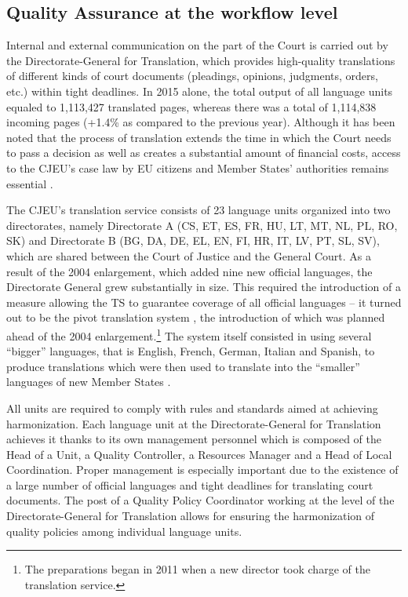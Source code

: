 \documentclass[output=paper]{langsci/langscibook}
\begin{document}
\subsection{Quality Assurance at the workflow level}\label{sec:kozbial:4.2}

Internal and external communication on the part of the Court is carried out by the Directorate-General for Translation, which provides high-quality translations of different kinds of court documents (pleadings, opinions, judgments, orders, etc.) within tight deadlines. In 2015 alone, the total output of all language units equaled to 1,113,427 translated pages, whereas there was a total of 1,114,838 incoming pages (+1.4\% as compared to the previous year). Although it has been noted that the process of translation extends the time in which the Court needs to pass a decision as well as creates a substantial amount of financial costs, access to the CJEU’s case law by EU citizens and Member States’ authorities remains essential \citep[23]{Roper2011}. 

The CJEU’s translation service consists of 23 language units organized into two directorates, namely Directorate A (CS, ET, ES, FR, HU, LT, MT, NL, PL, RO, SK) and Directorate B (BG, DA, DE, EL, EN, FI, HR, IT, LV, PT, SL, SV), which are shared between the Court of Justice and the General Court. As a result of the 2004 enlargement, which added nine new official languages, the Directorate General grew substantially in size. This required the introduction of a measure allowing the TS to guarantee coverage of all official languages – it turned out to be the pivot translation system \citep[184]{Šarčević2013}, the introduction of which was planned ahead of the 2004 enlargement.\footnote{The preparations began in 2011 when a new director took charge of the translation service.} The system itself consisted in using several “bigger” languages, that is English, French, German, Italian and Spanish, to produce translations which were then used to translate into the “smaller” languages of new Member States \citep[810–816]{McAuliffe2008}.

All units are required to comply with rules and standards aimed at achieving harmonization. Each language unit at the Directorate-General for Translation achieves it thanks to its own management personnel which is composed of the Head of a Unit, a Quality Controller, a Resources Manager and a Head of Local Coordination. Proper management is especially important due to the existence of a large number of official languages and tight deadlines for translating court documents. The post of a Quality Policy Coordinator working at the level of the Directorate-General for Translation allows for ensuring the harmonization of quality policies among individual language units.
\end{document}
